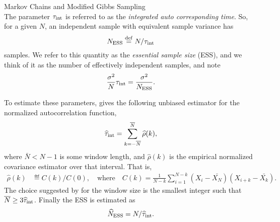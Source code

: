 \begin{chapter}{Markov Chains and Modified Gibbs Sampling}
\begin{equation}
\end{equation}
The parameter $\tau_{\rm int}$ is referred to as the \emph{integrated auto corresponding time}.
So, for a given $N$, an independent sample with equivalent sample variance has
\begin{equation}
  N_{\rm ESS} \eqdef N/\tau_{\rm int}
\end{equation}
samples.
We refer to this quantity as the \emph{essential sample size} (ESS), and we think of it as the number of effectively independent samples, and note
\begin{equation}
  \frac{\sigma^2}{N} \tau_{\rm int} = \frac{\sigma^2}{N_{\rm ESS}}.
\end{equation}

To estimate these parameters, \citep{sokal1997monte} gives the following unbiased estimator for the normalized autocorrelation function,
\begin{equation}
  \hat\tau_{\rm int}=\sum_{k=-\bar N}^{\bar N} \hat{\rho}(k),
\end{equation}
where $\bar N< N-1$ is some window length, and $\hat \rho(k)$ is the empirical normalized covariance estimator over that interval.
That is,
\begin{align}
\hat\rho(k)&\eqdef C(k)/C(0), \quad\text{where}\quad
C(k)=\frac{1}{N-k}\sum_{i=1}^{N-k} (X_i-\bar{X_N})(X_{i+k}-\bar{X_k}).
\end{align}
The choice suggested by \cite{sokal1997monte} for the window size is the smallest integer such that $\bar N\geq 3 \hat\tau_{\rm int}$. 
Finally the ESS is estimated as
\begin{equation}
\label{ESS}
\hat{N}_{\rm ESS}=N/\hat\tau_{\rm int}.
\end{equation}

\end{chapter}

